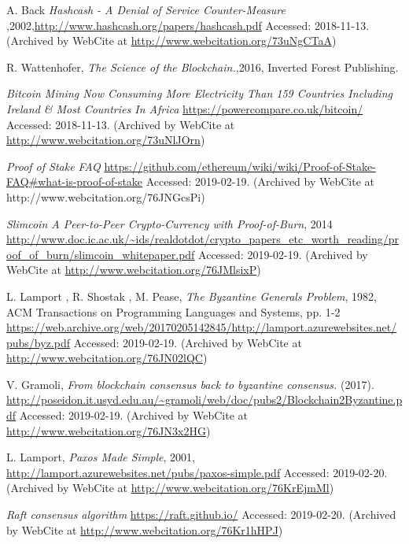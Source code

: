 \documentclass[final, 12pt,oneside]{class_diss}
\begin{document}
\begin{thebibliography}{10}
 A. Back \textit{Hashcash - A Denial of Service Counter-Measure
},2002,\url{http://www.hashcash.org/papers/hashcash.pdf} Accessed: 2018-11-13. (Archived by WebCite at \url{http://www.webcitation.org/73uNgCTaA})

R. Wattenhofer, \textit{The Science of the Blockchain.},2016, Inverted Forest Publishing.

 \textit{Bitcoin Mining Now Consuming More Electricity Than 159 Countries Including Ireland \& Most Countries In Africa} \url{https://powercompare.co.uk/bitcoin/} Accessed: 2018-11-13. (Archived by WebCite at \url{http://www.webcitation.org/73uNlJOrn})

 \textit{Proof of Stake FAQ} \url{https://github.com/ethereum/wiki/wiki/Proof-of-Stake-FAQ#what-is-proof-of-stake} Accessed: 2019-02-19. (Archived by WebCite at http://www.webcitation.org/76JNGcsPi)

 \textit{Slimcoin
A Peer-to-Peer Crypto-Currency with Proof-of-Burn}, 2014  \url{http://www.doc.ic.ac.uk/~ids/realdotdot/crypto_papers_etc_worth_reading/proof_of_burn/slimcoin_whitepaper.pdf} Accessed: 2019-02-19. (Archived by WebCite at \url{http://www.webcitation.org/76JMlsixP})

L. Lamport , R. Shostak , M. Pease, \textit{The Byzantine Generals Problem}, 1982,  ACM Transactions on Programming Languages and Systems, pp. 1-2 \url{https://web.archive.org/web/20170205142845/http://lamport.azurewebsites.net/pubs/byz.pdf} Accessed: 2019-02-19. (Archived by WebCite at \url{http://www.webcitation.org/76JN02lQC})

V. Gramoli, \textit{From blockchain consensus back to byzantine consensus.} (2017).  
\url{http://poseidon.it.usyd.edu.au/~gramoli/web/doc/pubs2/Blockchain2Byzantine.pdf} Accessed: 2019-02-19. (Archived by WebCite at \url{http://www.webcitation.org/76JN3x2HG})

 L. Lamport, \textit{Paxos Made Simple}, 2001, \url{http://lamport.azurewebsites.net/pubs/paxos-simple.pdf} Accessed: 2019-02-20. (Archived by WebCite at \url{http://www.webcitation.org/76KrEjmMl})

 \textit{Raft consensus algorithm} \url{https://raft.github.io/} Accessed: 2019-02-20. (Archived by WebCite at \url{http://www.webcitation.org/76Kr1hHPJ})


\end{thebibliography}
\end{document}
